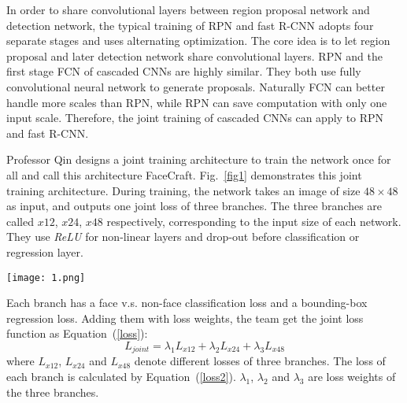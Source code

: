 \documentclass[twocolumn]{article}
\begin{document}
	In order to share convolutional layers between region proposal network and detection network, the typical training of RPN and fast R-CNN adopts four separate stages and uses alternating optimization. The core idea is to let region proposal and later detection network share convolutional layers. RPN and the first stage FCN of cascaded CNNs are highly similar. They both use fully convolutional neural network to generate proposals. Naturally FCN can better handle more scales than RPN, while RPN can save computation with only one input scale. Therefore, the joint training of cascaded CNNs can apply to RPN and fast R-CNN.
	
	Professor Qin designs a joint training architecture to train the network once for all and call this architecture FaceCraft. Fig.~\ref{fig1} demonstrates this joint training architecture. During training, the network takes an image of size $48 \times 48$ as input, and outputs one joint loss of three branches. The three branches are called $x12$, $x24$, $x48$ respectively, corresponding to the input size of each network. They use \emph{ReLU} for non-linear layers and drop-out before classification or regression layer.
	
	 \begin{figure*}[htbp] 
		\begin{center} 
			\texttt{[image: 1.png]} 
			\caption{Joint training architecture. During training, the network takes an image of size $48\times 48$ as input, and outputs one joint loss of three branches. The network is optimized through back-propagation. Compared to separate networks, the joint network also use threshold control layers, to decide which proposals from up branches contribute to the loss of the down branches.}\label{fig1}  
		\end{center}   
	\end{figure*}
	
    Each branch has a face v.s. non-face classification loss and a bounding-box regression loss. Adding them with loss weights, the team get the joint loss function as Equation~(\ref{loss}):
    \begin{equation}
    L_{joint}=\lambda_1L_{x12}+\lambda_2L_{x24}+\lambda_3L_{x48}    \label{loss}
    \end{equation}
    where $L_{x12}$, $L_{x24}$ and $L_{x48}$ denote different losses of three branches. The loss of each branch is calculated by Equation~(\ref{loss2}). $\lambda_1$, $\lambda_2$ and $\lambda_3$ are loss weights of the three branches. 
    
\end{document}
